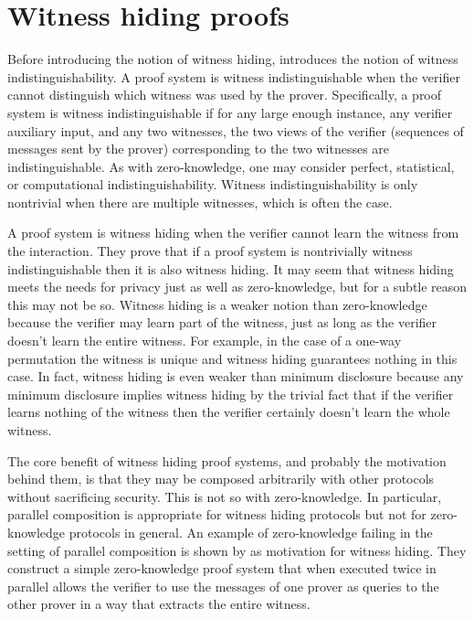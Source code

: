\section{Witness hiding proofs}

Before introducing the notion of witness hiding, \cite{FS90} introduces the notion of witness indistinguishability.
A proof system is witness indistinguishable when the verifier cannot distinguish which witness was used by the prover.
Specifically, a proof system is witness indistinguishable if for any large enough instance, any verifier auxiliary input, and any two witnesses, the two views of the verifier (sequences of messages sent by the prover) corresponding to the two witnesses are indistinguishable.
As with zero-knowledge, one may consider perfect, statistical, or computational indistinguishability.
Witness indistinguishability is only nontrivial when there are multiple witnesses, which is often the case.

A proof system is witness hiding when the verifier cannot learn the witness from the interaction.
They prove that if a proof system is nontrivially witness indistinguishable then it is also witness hiding.
It may seem that witness hiding meets the needs for privacy just as well as zero-knowledge, but for a subtle reason this may not be so.
Witness hiding is a weaker notion than zero-knowledge because the verifier may learn part of the witness, just as long as the verifier doesn't learn the entire witness.
For example, in the case of a one-way permutation the witness is unique and witness hiding guarantees nothing in this case.
In fact, witness hiding is even weaker than minimum disclosure because any minimum disclosure implies witness hiding by the trivial fact that if the verifier learns nothing of the witness then the verifier certainly doesn't learn the whole witness.

The core benefit of witness hiding proof systems, and probably the motivation behind them, is that they may be composed arbitrarily with other protocols without sacrificing security.
This is not so with zero-knowledge.
In particular, parallel composition is appropriate for witness hiding protocols but not for zero-knowledge protocols in general.
An example of zero-knowledge failing in the setting of parallel composition is shown by \cite{FS90} as motivation for witness hiding.
They construct a simple zero-knowledge proof system that when executed twice in parallel allows the verifier to use the messages of one prover as queries to the other prover in a way that extracts the entire witness.


